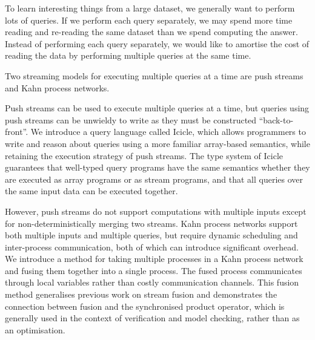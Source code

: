 To learn interesting things from a large dataset, we generally want to perform lots of queries.
If we perform each query separately, we may spend more time reading and re-reading the same dataset than we spend computing the answer.
Instead of performing each query separately, we would like to amortise the cost of reading the data by performing multiple queries at the same time.

Two streaming models for executing multiple queries at a time are push streams and Kahn process networks.

Push streams can be used to execute multiple queries at a time, but queries using push streams can be unwieldy to write as they must be constructed ``back-to-front''.
We introduce a query language called Icicle, which allows programmers to write and reason about queries using a more familiar array-based semantics, while retaining the execution strategy of push streams.
The type system of Icicle guarantees that well-typed query programs have the same semantics whether they are executed as array programs or as stream programs, and that all queries over the same input data can be executed together.

However, push streams do not support computations with multiple inputs except for non-deterministically merging two streams.
Kahn process networks support both multiple inputs and multiple queries, but require dynamic scheduling and inter-process communication, both of which can introduce significant overhead.
We introduce a method for taking multiple processes in a Kahn process network and fusing them together into a single process.
The fused process communicates through local variables rather than costly communication channels.
This fusion method generalises previous work on stream fusion and demonstrates the connection between fusion and the synchronised product operator, which is generally used in the context of verification and model checking, rather than as an optimisation.


